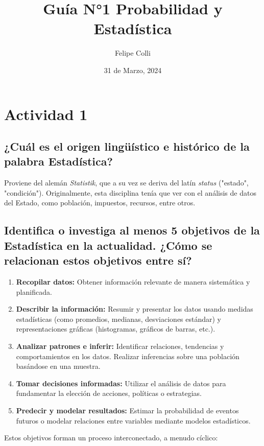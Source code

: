 \documentclass[12pt, letterpaper]{article}
\title{ Guía N°1 Probabilidad y Estadística}
\author{Felipe Colli}
\date{31 de Marzo, 2024}
\begin{document}
\maketitle
\tableofcontents
\newpage %

\section{Actividad 1}
\subsection{¿Cuál es el origen lingüístico e histórico de la palabra Estadística?}
Proviene del alemán \textit{Statistik}, que a su vez se deriva del latín \textit{status} ("estado", "condición"). Originalmente, esta disciplina tenía que ver con el análisis de datos del Estado, como población, impuestos, recursos, entre otros.

\subsection{Identifica o investiga al menos 5 objetivos de la Estadística en la actualidad. ¿Cómo se relacionan estos objetivos entre sí?}
\begin{enumerate}
    \item \textbf{Recopilar datos:} Obtener información relevante de manera sistemática y planificada.
    \item \textbf{Describir la información:} Resumir y presentar los datos usando medidas estadísticas (como promedios, medianas, desviaciones estándar) y representaciones gráficas (histogramas, gráficos de barras, etc.).
    \item \textbf{Analizar patrones e inferir:} Identificar relaciones, tendencias y comportamientos en los datos. Realizar inferencias sobre una población basándose en una muestra.
    \item \textbf{Tomar decisiones informadas:} Utilizar el análisis de datos para fundamentar la elección de acciones, políticas o estrategias.
    \item \textbf{Predecir y modelar resultados:} Estimar la probabilidad de eventos futuros o modelar relaciones entre variables mediante modelos estadísticos.
\end{enumerate}
Estos objetivos forman un proceso interconectado, a menudo cíclico:
\end{document}
